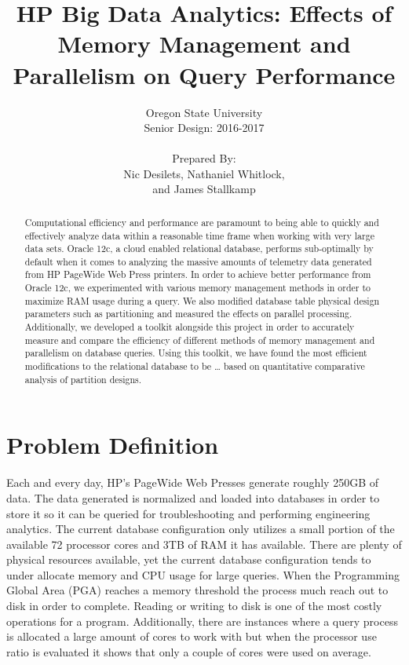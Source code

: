\documentclass[draftclsnofoot, onecolumn, 10pt]{IEEEtran}
\title{\huge HP Big Data Analytics: Effects of Memory Management and Parallelism on Query Performance}
\author{Oregon State University\\Senior Design: 2016-2017\\\\Prepared By:\\Nic Desilets, Nathaniel Whitlock,\\ and James Stallkamp}
\begin{document}
\begin{titlingpage}
    \maketitle
    
    \begin{abstract}
		Computational efficiency and performance are paramount to being able to quickly and effectively analyze data within a reasonable time frame when working with very large data sets. Oracle 12c, a cloud enabled relational database, performs sub-optimally by default when it comes to analyzing the massive amounts of telemetry data generated from HP PageWide Web Press printers. In order to achieve better performance from Oracle 12c, we experimented with various memory management methods in order to maximize RAM usage during a query. We also modified database table physical design parameters such as partitioning and measured the effects on parallel processing.  Additionally, we developed a toolkit alongside this project in order to accurately measure and compare the efficiency of different methods of memory management and parallelism on database queries. Using this toolkit, we have found the most efficient modifications to the relational database to be … based on quantitative comparative analysis of partition designs.
    \end{abstract}
\end{titlingpage}


\section*{Problem Definition}
Each and every day, HP’s PageWide Web Presses generate roughly 250GB of data. The data generated is normalized and loaded into databases in order to store it so it can be queried for troubleshooting and performing engineering analytics. The current database configuration only utilizes a small portion of the available 72 processor cores and 3TB of RAM it has available. There are plenty of physical resources available, yet the current database configuration tends to under allocate memory and CPU usage for large queries. When the Programming Global Area (PGA) reaches a memory threshold the process much reach out to disk in order to complete. Reading or writing to disk is one of the most costly operations for a program. Additionally, there are instances where a query process is allocated a large amount of cores to work with but when the processor use ratio is evaluated it shows that only a couple of cores were used on average.
\end{document}
